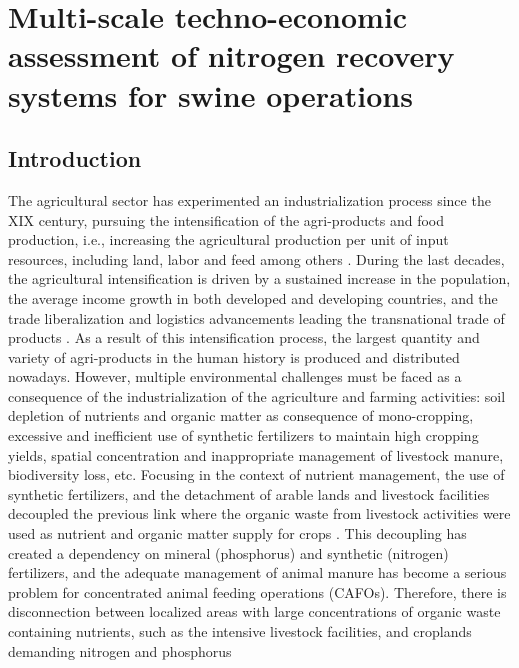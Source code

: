 \chapter{Multi-scale techno-economic assessment of nitrogen recovery systems for swine operations}\label{ch:NitrogenTechs}
\begin{refsection}[referencesCh6]
\section{Introduction}
The agricultural sector has experimented an industrialization process since the XIX century, pursuing the intensification of the agri-products and food production, i.e., increasing the agricultural production per unit of input resources, including land, labor and feed among others \citep{FAOethics2004}. During the last decades, the agricultural intensification is driven by a sustained increase in the population, the average income growth in both developed and developing countries, and the trade liberalization and logistics advancements leading the transnational trade of products \citep{baker2014trends}. As a result of this intensification process, the largest quantity and variety of agri-products in the human history is produced and distributed nowadays. However, multiple environmental challenges must be faced as a consequence of the industrialization of the agriculture and farming activities: soil depletion of nutrients and organic matter as consequence of mono-cropping, excessive and inefficient use of synthetic fertilizers to maintain high cropping yields, spatial concentration and inappropriate management of livestock manure, biodiversity loss, etc. 
Focusing in the context of nutrient management, the use of synthetic fertilizers, and the detachment of arable lands and livestock facilities decoupled the previous link where the organic waste from livestock activities were used as nutrient and organic matter supply for crops \citep{bouwman2009human}. This decoupling has created a dependency on mineral (phosphorus) and synthetic (nitrogen) fertilizers, and the adequate management of animal manure has become a serious problem for concentrated animal feeding operations (CAFOs). Therefore, there is disconnection between localized areas with large concentrations of organic waste containing nutrients, such as the intensive livestock facilities, and croplands demanding nitrogen and phosphorus

\end{refsection}
